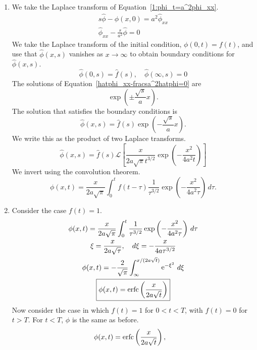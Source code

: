 {%
\begin{Solution}
  \begin{enumerate}
  \item
    We take the Laplace transform of Equation~\ref{1:phi_t=a^2phi_xx}.
    \begin{gather}
      \nonumber
      s \hat{\phi} - \phi(x,0) = a^2 \hat{\phi}_{x x} \\
      \label{hatphi_xx-fracsa^2hatphi=0}
      \hat{\phi}_{x x} - \frac{s}{a^2} \hat{\phi} = 0
    \end{gather}
    We take the Laplace transform of the initial condition, 
    $\phi(0,t) = f(t)$, and use that $\hat{\phi}(x,s)$ vanishes as
    $x \to \infty$ to obtain boundary conditions for $\hat{\phi}(x,s)$.
    \[
    \hat{\phi}(0,s) = \hat{f}(s), \quad
    \hat{\phi}(\infty,s) = 0
    \]
    The solutions of Equation~\ref{hatphi_xx-fracsa^2hatphi=0} are
    \[
    \exp \left( \pm \frac{\sqrt{s}}{a} x \right).
    \]
    The solution that satisfies the boundary conditions is
    \[
    \hat{\phi}(x,s) = \hat{f}(s) \exp \left( -\frac{\sqrt{s}}{a} x \right).
    \]
    We write this as the product of two Laplace transforms.
    \[
    \hat{\phi}(x,s) = \hat{f}(s) 
    \mathcal{L} \left[ \frac{ x }{ 2 a \sqrt{\pi} t^{3/2} }
      \exp \left( - \frac{ x^2 }{ 4 a^2 t } \right) \right]
    \]
    We invert using the convolution theorem.
    \[
    \boxed{
      \phi(x,t) = \frac{x}{2 a \sqrt{\pi}} \int_0^t f(t - \tau) 
      \frac{1}{\tau^{3/2}} \exp \left( - \frac{x^2}{4 a^2 \tau} 
      \right) \,d\tau.
      }
    \]
  \item
    Consider the case $f(t) = 1$.
    \begin{gather*}
      \phi(x,t) = \frac{x}{2 a \sqrt{\pi}} \int_0^t 
      \frac{1}{\tau^{3/2}} \exp \left( - \frac{x^2}{4 a^2 \tau} 
      \right) \,d\tau \\
      \xi = \frac{x}{2 a \sqrt{\tau}}, \quad
      d\xi = - \frac{x}{4 a \tau^{3/2}} \\
      \phi(x,t) = - \frac{2}{\sqrt{\pi}} \int_\infty^{x/(2 a \sqrt{t})}
      \mathop{\mathrm{e}}\nolimits^{-\xi^2} \,d \xi \\
      \boxed{
        \phi(x,t) = \mathop{\mathrm{erfc}}\nolimits \left( \frac{ x }{ 2 a \sqrt{t} } \right)
        }
    \end{gather*}
    Now consider the case in which $f(t) = 1$ for $0 < t < T$, 
    with $ f(t) = 0$ for $ t > T$.  For $t < T$, $\phi$ is the same 
    as before.
    \[
    \phi(x,t) = \mathop{\mathrm{erfc}}\nolimits \left( \frac{ x }{ 2 a \sqrt{t} } \right), \quad
\]
\end{enumerate}
\end{Solution}}
